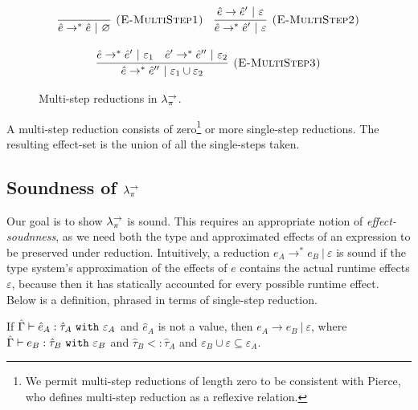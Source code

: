\begin{figure}[h]

\noindent
{}

\[
\begin{array}{c}

\infer[\textsc{(E-MultiStep1)}]
	{\hat e \rightarrow^{*} \hat e~|~\varnothing}
	{}
~~~
\infer[\textsc{(E-MultiStep2)}]
	{\hat e \rightarrow^{*} \hat e'~|~\varepsilon}
	{\hat e \rightarrow \hat e'~|~\varepsilon} \\[3ex]
	
\infer[\textsc{(E-MultiStep3)}]
	{\hat e \rightarrow^{*} \hat e''~|~\varepsilon_1 \cup \varepsilon_2}
	{\hat e \rightarrow^{*} \hat e'~|~\varepsilon_1 & \hat e' \rightarrow^{*} \hat e''~|~\varepsilon_2}
\end{array}
\]

\vspace{-7pt}
\caption{Multi-step reductions in $\lambda^{\rightarrow}_{\pi}$.}
\label{This is the label.}
\end{figure}

A multi-step reduction consists of zero\footnote{We permit multi-step reductions of length zero to be consistent with Pierce, who defines multi-step reduction as a reflexive relation\cite[p. 39]{tapl}.} or more single-step reductions. The resulting effect-set is the union of all the single-steps taken.

\subsection{Soundness of $\lambda^{\rightarrow}_{\pi}$}

Our goal is to show $\lambda^{\rightarrow}_{\pi}$ is sound. This requires an appropriate notion of \textit{effect-soudnness}, as we need both the type and approximated effects of an expression to be preserved under reduction. Intuitively, a reduction $e_A \longrightarrow^* e_B~|~\varepsilon$ is sound if the type system's approximation of the effects of $e$ contains the actual runtime effects $\varepsilon$, because then it has statically accounted for every possible runtime effect. Below is a definition, phrased in terms of single-step reduction.


\begin{theorem}[Soundness]
If $\hat \Gamma \vdash \hat e_A: \hat \tau_A~\mathtt{with}~ \varepsilon_A$ and $\hat e_A$ is not a value, then $e_A \longrightarrow e_B~|~\varepsilon$, where $\hat \Gamma \vdash e_B: \hat \tau_B~\mathtt{with}~ \varepsilon_B$ and $\hat \tau_B <: \hat \tau_A$ and $\varepsilon_B \cup \varepsilon \subseteq \varepsilon_A$.
\end{theorem}


